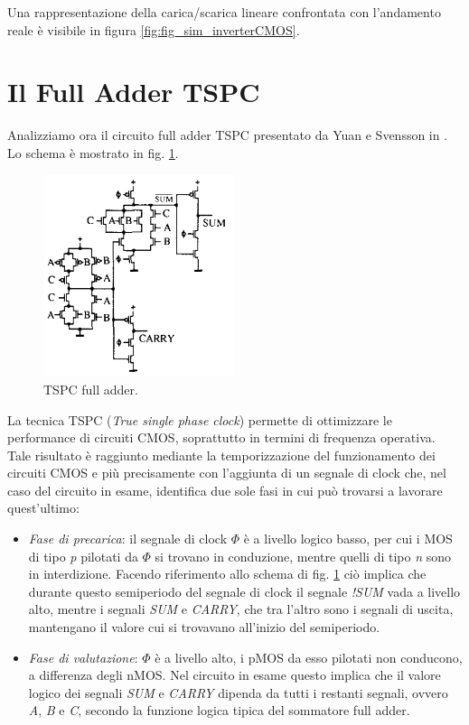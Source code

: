 Una rappresentazione della carica/scarica lineare confrontata con l'andamento reale è visibile in figura \ref{fig:fig_sim_inverterCMOS}.

\section{Il Full Adder TSPC}
\label{sec:sec_fullAdder}

Analizziamo ora il circuito full adder TSPC presentato da Yuan e Svensson in \cite{yuan1989high}. Lo schema è mostrato in fig. \ref{fig:fig_schemaDaArticolo}.

\begin{figure}[hbt!]
	\centering
	\includegraphics[width=0.5\textwidth]{figure/SchemaFullAdderTSPC_DaArticolo.PNG}
	\caption{TSPC full adder.}
	\label{fig:fig_schemaDaArticolo}
\end{figure}

La tecnica TSPC (\textit{True single phase clock}) permette di ottimizzare le performance di circuiti CMOS, soprattutto in termini di frequenza operativa. Tale risultato è raggiunto mediante la temporizzazione del funzionamento dei circuiti CMOS e più precisamente con l'aggiunta di un segnale di clock che, nel caso del circuito in esame, identifica due sole fasi in cui può trovarsi a lavorare quest'ultimo:

\begin{itemize}
	\item \textit{Fase di precarica}: il segnale di clock $\Phi$ è a livello logico basso, per cui i MOS di tipo \textit{p} pilotati da $\Phi$ si trovano in conduzione, mentre quelli di tipo \textit{n} sono in interdizione. Facendo riferimento allo schema di fig.  \ref{fig:fig_schemaDaArticolo} ciò implica che durante questo semiperiodo del segnale di clock il segnale \textit{!SUM} vada a livello alto, mentre i segnali \textit{SUM} e \textit{CARRY}, che tra l'altro sono i segnali di uscita, mantengano il valore cui si trovavano all'inizio del semiperiodo. 
	\item \textit{Fase di valutazione}: $\Phi$ è a livello alto, i pMOS da esso pilotati non conducono, a differenza degli nMOS. Nel circuito in esame questo implica che il valore logico dei segnali \textit{SUM} e \textit{CARRY} dipenda da tutti i restanti segnali, ovvero \textit{A}, \textit{B} e \textit{C}, secondo la funzione logica tipica del sommatore full adder.
\end{itemize}

